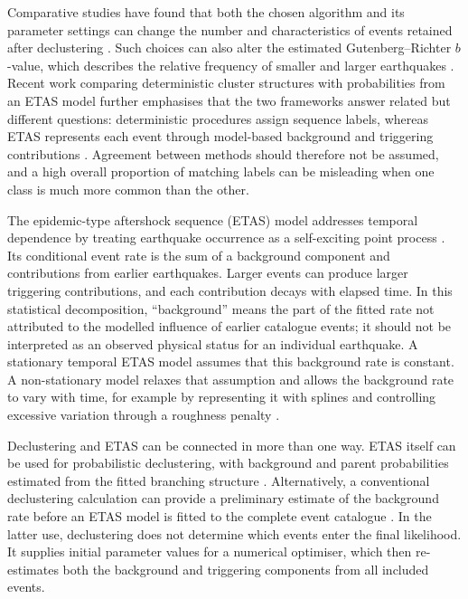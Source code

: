 Comparative studies have found that both the chosen algorithm and its parameter
settings can change the number and characteristics of events retained after
declustering \citep{perry2024comparative}. Such choices can also alter the
estimated Gutenberg--Richter $b$-value, which describes the relative frequency
of smaller and larger earthquakes \citep{mizrahi2021effect}. Recent work
comparing deterministic cluster structures with probabilities from an ETAS
model further emphasises that the two frameworks answer related but different
questions: deterministic procedures assign sequence labels, whereas ETAS
represents each event through model-based background and triggering
contributions \citep{spassiani2025reconciling}. Agreement between methods
should therefore not be assumed, and a high overall proportion of matching
labels can be misleading when one class is much more common than the other.

The epidemic-type aftershock sequence (ETAS) model addresses temporal
dependence by treating earthquake occurrence as a self-exciting point process
\citep{ogata1988statistical}. Its conditional event rate is the sum of a
background component and contributions from earlier earthquakes. Larger
events can produce larger triggering contributions, and each contribution
decays with elapsed time. In this statistical decomposition, ``background''
means the part of the fitted rate not attributed to the modelled influence of
earlier catalogue events; it should not be interpreted as an observed physical
status for an individual earthquake. A stationary temporal ETAS model assumes
that this background rate is constant. A non-stationary model relaxes that
assumption and allows the background rate to vary with time, for example by
representing it with splines and controlling excessive variation through a
roughness penalty \citep{kumazawa2014nonstationary,kattamanchi2017nonstationary}.

Declustering and ETAS can be connected in more than one way. ETAS itself can be
used for probabilistic declustering, with background and parent probabilities
estimated from the fitted branching structure \citep{zhuang2002stochastic}.
Alternatively, a conventional declustering calculation can provide a
preliminary estimate of the background rate before an ETAS model is fitted to
the complete event catalogue \citep{ogata1998space,zhuang2002stochastic}. In
the latter use, declustering does not determine which events enter the final
likelihood. It supplies initial parameter values for a numerical optimiser,
which then re-estimates both the background and triggering components from all
included events.

